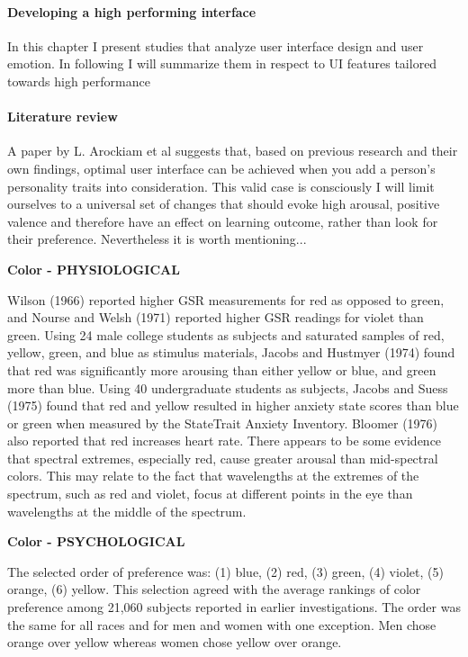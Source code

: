 \paragraph{Developing a high performing interface}

In this chapter I present studies that analyze user interface design and user emotion. In following I will summarize them in respect to UI features tailored towards high performance

\paragraph{Literature review}

A paper by L. Arockiam et al \cite{Arockiam2013} suggests that, based on previous research and their own findings, optimal user interface can be achieved when you add a person's personality traits into consideration. This valid case is consciously  I will limit ourselves to a universal set of changes that should evoke high arousal, positive valence and therefore have an effect on learning outcome, rather than look for their preference. Nevertheless it is worth mentioning...

\textbf{Color - PHYSIOLOGICAL}

Wilson (1966) reported higher GSR measurements for red as opposed to green, and Nourse and Welsh (1971) reported higher GSR readings for violet than green. Using 24 male college students as subjects and saturated samples of red, yellow, green, and blue as stimulus materials, Jacobs and Hustmyer (1974) found that red was significantly more arousing than either yellow or blue, and green more than blue. Using 40 undergraduate students as subjects, Jacobs and Suess (1975) found that red and yellow resulted in higher anxiety state scores than blue or green when measured by the StateTrait Anxiety Inventory. Bloomer (1976) also reported that red increases heart rate. There appears to be some evidence that spectral extremes, especially red, cause greater arousal than mid-spectral colors. This may relate to the fact that wavelengths at the extremes of the spectrum, such as red and violet, focus at different points in the eye than wavelengths at the middle of the spectrum. \cite{Pert1996}

\textbf{Color - PSYCHOLOGICAL}

The selected order of preference was: (1) blue, (2) red, (3) green, (4) violet, (5) orange, (6) yellow. This selection agreed with the average rankings of color preference among 21,060 subjects reported in earlier investigations. The order was the same for all races and for men and women with one exception. Men chose orange over yellow whereas women chose yellow over orange. \cite{Pert1996}

